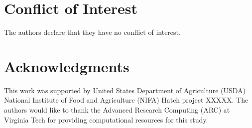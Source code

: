 \section*{Conflict of Interest}

The authors declare that they have no conflict of interest.

\section*{Acknowledgments}

This work was supported by United States Department of Agriculture (USDA) National Institute of Food and Agriculture (NIFA) Hatch project XXXXX. The authors would like to thank the Advanced Research Computing (ARC) at Virginia Tech for providing computational resources for this study.
